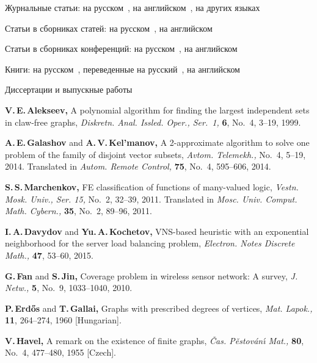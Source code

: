 \documentclass[10pt]{article}
\date{}
\begin{document}
Журнальные статьи: на русском~\cite{Alekseev1999,GK2014,Marchenkov2011}, 
на английском~\cite{DK2015,FJ2010}, на других языках~\cite{EG1960,Havel1955,Konig1916}

Статьи в сборниках статей: на русском~\cite{Vasilev1978}, на английском~\cite{Yablonskii1982}

Статьи в сборниках конференций: на русском~\cite{KS2014,Zakharova2010}, на английском~\cite{Malyugin2001,Uhlig1987}

Книги: на русском~\cite{Alekseev2004,EMST1990,Stetsyuk2014}, переведенные на русский~\cite{GJ1979}, на английском~\cite{Attallah1998}

Диссертации и выпускные работы~\cite{Chugunova2007,Hansen1992}

\begin{thebibliography}{99}  %

\textbf{V.\,E.\,Alekseev,} 
A polynomial algorithm for finding the largest independent sets in claw-free graphs, 
\textit{Diskretn. Anal. Issled. Oper., Ser.~1,} \textbf{6}, No.~4, 3--19, 1999.

\textbf{A.\,E.\,Galashov} and \textbf{A.\,V.\,Kel'manov,} 
A 2-approximate algorithm to solve one problem of the family of disjoint vector subsets, 
\textit{Avtom. Telemekh.,} No.~4, 5--19, 2014. 
Translated in \textit{Autom. Remote Control,} \textbf{75}, No.~4, 595--606, 2014.

\textbf{S.\,S.\,Marchenkov,} FE classification of functions of many-valued logic, 
\textit{Vestn. Mosk. Univ., Ser. 15,} No.~2, 32--39, 2011.
Translated in \textit{Mosc. Univ. Comput. Math. Cybern.,} \textbf{35}, No.~2, 89--96, 2011.

\textbf{I.\,A.\,Davydov} and \textbf{Yu.\,A.\,Kochetov,}
VNS-based heuristic with an exponential neighborhood for the server load balancing problem, 
\textit{Electron. Notes Discrete Math.,} \textbf{47}, 53--60, 2015.

\textbf{G.\,Fan} and \textbf{S.\,Jin,} Coverage problem in wireless sensor network: A survey, 
\textit{J. Netw.,} \textbf{5}, No.~9, 1033--1040, 2010.

\textbf{P.\,Erd\H{o}s} and \textbf{T.\,Gallai,} Graphs with prescribed degrees of vertices, 
\textit{Mat. Lapok.,} \textbf{11}, 264--274, 1960 [Hungarian].

\textbf{V.\,Havel,} A remark on the existence of finite graphs, 
\textit{\v{C}as. P\v{e}stov\'{a}n\'{\i} Mat.,} \textbf{80}, No.~4, 477--480, 1955 [Czech].


\end{thebibliography}
\end{document}
